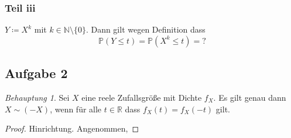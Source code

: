 \documentclass[fleqn,draft,a5paper,12pt]{article}
\theoremstyle{remark}
\newtheorem*{Behauptung}{Behauptung}
\newcommand{\cP}{\mathbb{P}}
\begin{document}
\subsubsection{Teil iii}
\(Y \coloneq X^{k}\) mit \(k \in \mathbb{N} \setminus \{0\}\). Dann gilt wegen Definition dass
\[\cP(Y \le t) = \cP(X^{k} \le t) = ? \]
\subsection{Aufgabe 2}
\begin{Behauptung}
  Sei \(X\) eine reele Zufallsgröße mit Dichte \(f_{X}\). Es gilt genau
  dann \(X \sim (-X)\), wenn für alle \(t \in \mathbb{R}\) dass
  \(f_{X}(t) = f_{X}(-t)\) gilt.
\end{Behauptung}
\begin{proof}
  Hinrichtung.  Angenommen, 
\end{proof}
\end{document}

